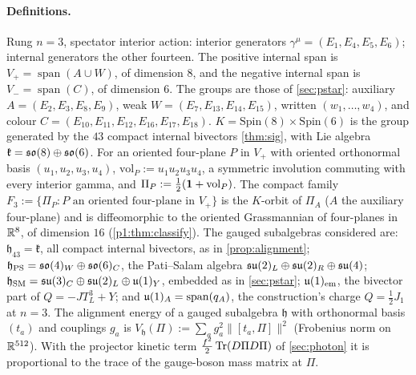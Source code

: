 \paragraph{Definitions.} Rung $n=3$, spectator interior action: interior generators $\gamma^\mu=(E_1,E_4,E_5,E_6)$; internal generators the other fourteen. The
positive internal span is $V_+=\operatorname{span}(A\cup W)$, of dimension $8$, and the negative internal span is $V_-=\operatorname{span}(C)$, of dimension $6$. The groups are those of \cref{sec:pstar}: auxiliary $A=(E_2,E_3,E_8,E_9)$,
weak $W=(E_7,E_{13},E_{14},E_{15})$, written $(w_1,\dots,w_4)$, and colour $C=(E_{10},E_{11},E_{12},E_{16},E_{17},E_{18})$.
$K=\mathrm{Spin}(8)\times\mathrm{Spin}(6)$ is the group generated by the $43$ compact internal bivectors \cref{thm:sig}, with Lie algebra $\mathfrak k=\mathfrak{so}(8)\oplus\mathfrak{so}(6)$. For an
oriented four-plane $P$ in $V_+$ with oriented orthonormal basis $(u_1,u_2,u_3,u_4)$, $\mathrm{vol}_P:=u_1u_2u_3u_4$, a symmetric involution commuting with every interior
gamma, and $\Pi_P:=\tfrac12(\mathbf 1+\mathrm{vol}_P)$. The compact family $F_3:=\{\Pi_P:P\text{ an oriented four-plane in }V_+\}$ is the $K$-orbit of $\Pi_A$ ($A$ the
auxiliary four-plane) and is diffeomorphic to the oriented Grassmannian of four-planes in $\mathbb{R}^8$, of dimension $16$ (\cref{p1:thm:classify}). The gauged subalgebras considered
are: $\mathfrak h_{43}=\mathfrak k$, all compact internal bivectors, as in \cref{prop:alignment}; $\mathfrak h_{\rm PS}=\mathfrak{so}(4)_W\oplus\mathfrak{so}(6)_C$, the Pati--Salam algebra
$\mathfrak{su}(2)_L\oplus\mathfrak{su}(2)_R\oplus\mathfrak{su}(4)$; $\mathfrak h_{\rm SM}=\mathfrak{su}(3)_C\oplus\mathfrak{su}(2)_L\oplus\mathfrak{u}(1)_Y$, embedded as in \cref{sec:pstar}; $\mathfrak{u}(1)_{\rm em}$, the bivector part of
$Q=-JT^3_L+Y$; and $\mathfrak{u}(1)_A=\operatorname{span}(q_A)$, the construction's charge $Q=\tfrac12J_1$ at $n=3$. The alignment energy of a gauged subalgebra $\mathfrak h$ with
orthonormal basis $(t_a)$ and couplings $g_a$ is $V_{\mathfrak h}(\Pi):=\sum_ag_a^2\|[t_a,\Pi]\|^2$ (Frobenius norm on $\mathbb{R}^{512}$). With the projector kinetic term
$\tfrac{f^2}2\operatorname{Tr}(D\Pi D\Pi)$ of \cref{sec:photon} it is proportional to the trace of the gauge-boson mass matrix at $\Pi$.

